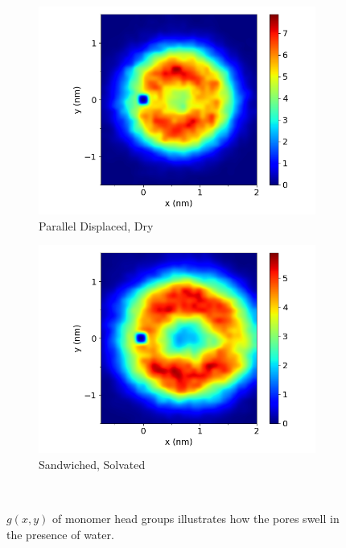 \documentclass[journal=jpcbfk,manusciprt=article]{achemso}
\begin{document}
\begin{figure}
\begin{subfigure}{0.47\textwidth}
        \includegraphics[width=1\linewidth]{offset_xy_correlation.png}
        \caption{Parallel Displaced, Dry}
        \label{fig:offset_xy_correlation_comparison}
  \end{subfigure}
  \begin{subfigure}{0.47\textwidth}
        \includegraphics[width=1\linewidth]{offset_solvated_xy_correlation.png}
        \caption{Sandwiched, Solvated}
        \label{fig:offset_solvated_xy_correlation}
  \end{subfigure}
  \caption{$g(x,y)$ of monomer head groups illustrates how the pores
	  swell in the presence of water.}~\label{fig:solvated_correlation}
  \end{figure}
\end{document}
